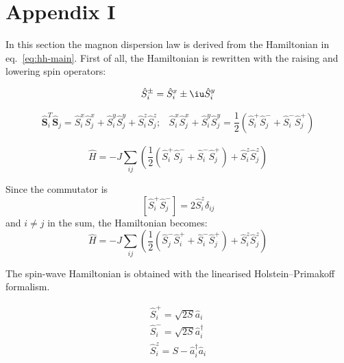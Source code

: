 \section{Appendix I}

In this section the magnon dispersion law is derived from the Hamiltonian in eq.~\eqref{eq:hh-main}.
First of all, the Hamiltonian is rewritten with the raising and lowering spin operators:

\begin{equation}
    \hat{S}_i^{\pm} = \hat{S}_i^x \pm \iu \hat{S}_i^y
\end{equation}

\begin{equation}
    \begin{matrix}
        \hat{\mathbf{S}}_i^T \hat{\mathbf{S}}_j = 
        \hat{S}_i^x \hat{S}_j^x + \hat{S}_i^y \hat{S}_j^y + \hat{S}_i^z \hat{S}_j^z; &
        \hat{S}_i^x \hat{S}_j^x + \hat{S}_i^y \hat{S}_j^y = 
        \dfrac{1}{2}\left(\hat{S}_i^+\hat{S}_j^- + \hat{S}_i^-\hat{S}_j^+\right)
    \end{matrix}
\end{equation}

\begin{equation}
    \hat{H} = -J \sum_{ij} \left(\dfrac{1}{2}\left(
        \hat{S}_i^+\hat{S}_j^- + \hat{S}_i^-\hat{S}_j^+\right) + \hat{S}_i^z \hat{S}_j^z\right)
\end{equation}

Since the commutator is 
\begin{equation}
    \left[\hat{S}_i^+\hat{S}_j^-\right] = 2\hat{S}_i^z\delta_{ij}
\end{equation}
and $i\ne j$ in the sum, the Hamiltonian becomes:
\begin{equation}
    \hat{H} =-J \sum_{ij} \left(\dfrac{1}{2}\left(
            \hat{S}_j^-\hat{S}_i^+ + \hat{S}_i^-\hat{S}_j^+\right) + \hat{S}_i^z \hat{S}_j^z\right)
\end{equation}

The spin-wave Hamiltonian is obtained with the linearised Holstein–Primakoff formalism.

\begin{equation}
    \begin{matrix}
        \hat{S}_i^+ = \sqrt{2S}\hat{a}_i \\
        \hat{S}_i^- = \sqrt{2S}\hat{a}_i^{\dag} \\
        \hat{S}_i^z = S - \hat{a}_i^{\dag}\hat{a}_i
    \end{matrix}
\end{equation}

